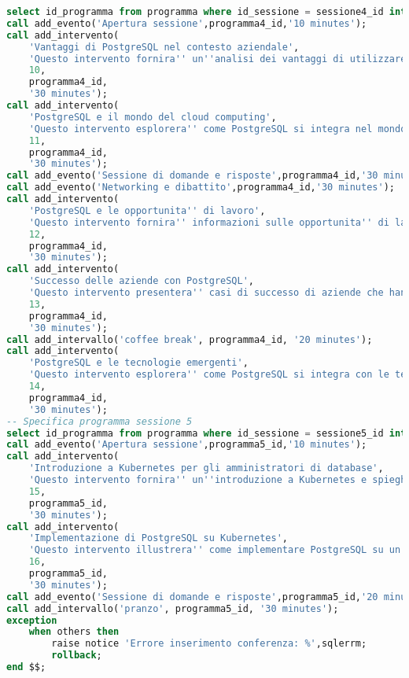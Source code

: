 \begin{lstlisting}[language=SQL, style=mystyle,caption={Conferenza PGConf NPL}]
select id_programma from programma where id_sessione = sessione4_id into programma4_id;
call add_evento('Apertura sessione',programma4_id,'10 minutes');
call add_intervento(
    'Vantaggi di PostgreSQL nel contesto aziendale',
    'Questo intervento fornira'' un''analisi dei vantaggi di utilizzare PostgreSQL nel contesto aziendale, compresa l''affidabilita'', le prestazioni e il supporto della comunita''.',
    10,
    programma4_id,
    '30 minutes');
call add_intervento(
    'PostgreSQL e il mondo del cloud computing',
    'Questo intervento esplorera'' come PostgreSQL si integra nel mondo del cloud computing e come le aziende possono trarre vantaggio dall''utilizzo di PostgreSQL come database cloud-native.',
    11,
    programma4_id,
    '30 minutes');
call add_evento('Sessione di domande e risposte',programma4_id,'30 minutes');
call add_evento('Networking e dibattito',programma4_id,'30 minutes');
call add_intervento(
    'PostgreSQL e le opportunita'' di lavoro',
    'Questo intervento fornira'' informazioni sulle opportunita'' di lavoro e carriera legate all''esperienza con PostgreSQL, inclusi i ruoli professionali, le competenze richieste e le tendenze del mercato.',
    12,
    programma4_id,
    '30 minutes');
call add_intervento(
    'Successo delle aziende con PostgreSQL',
    'Questo intervento presentera'' casi di successo di aziende che hanno adottato PostgreSQL come database principale e i benefici che hanno ottenuto.',
    13,
    programma4_id,
    '30 minutes');
call add_intervallo('coffee break', programma4_id, '20 minutes');
call add_intervento(
    'PostgreSQL e le tecnologie emergenti',
    'Questo intervento esplorera'' come PostgreSQL si integra con le tecnologie emergenti, come l''intelligenza artificiale, l''Internet of Things (IoT) e l''analisi dei big data.',
    14,
    programma4_id,
    '30 minutes');
-- Specifica programma sessione 5
select id_programma from programma where id_sessione = sessione5_id into programma5_id;
call add_evento('Apertura sessione',programma5_id,'10 minutes');
call add_intervento(
    'Introduzione a Kubernetes per gli amministratori di database',
    'Questo intervento fornira'' un''introduzione a Kubernetes e spieghera'' come gli amministratori di database possono utilizzare questa piattaforma per orchestrare e gestire il deployment di istanze di PostgreSQL.',
    15,
    programma5_id,
    '30 minutes');
call add_intervento(
    'Implementazione di PostgreSQL su Kubernetes',
    'Questo intervento illustrera'' come implementare PostgreSQL su un cluster Kubernetes, fornendo linee guida e best practice per il deployment, la scalabilita'' e la gestione delle istanze di PostgreSQL.',
    16,
    programma5_id,
    '30 minutes');
call add_evento('Sessione di domande e risposte',programma5_id,'20 minutes');
call add_intervallo('pranzo', programma5_id, '30 minutes');
exception
    when others then
        raise notice 'Errore inserimento conferenza: %',sqlerrm;
        rollback;
end $$;
\end{lstlisting}